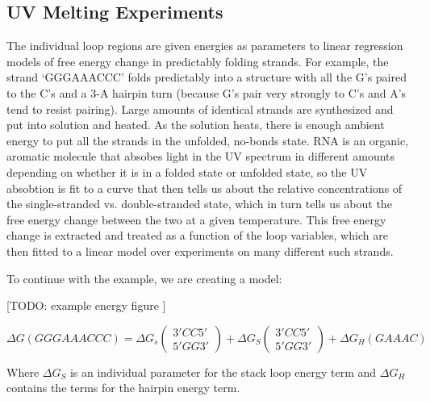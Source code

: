 \subsection{UV Melting Experiments} 

The individual loop regions are given energies as parameters to linear
regression models of free energy change in predictably folding
strands. For example, the strand `GGGAAACCC' folds predictably into a
structure with all the G's paired to the C's and a 3-A hairpin turn
(because G's pair very strongly to C's and A's tend to resist
pairing). Large amounts of identical strands are synthesized and put
into solution and heated. As the solution heats, there is enough
ambient energy to put all the strands in the unfolded, no-bonds
state. RNA is an organic, aromatic molecule that absobes light in the
UV spectrum in different amounts depending on whether it is in a
folded state or unfolded state, so the UV absobtion is fit to a curve
that then tells us about the relative concentrations of the
single-stranded vs. double-stranded state, which in turn tells us
about the free energy change between the two at a given
temperature. This free energy change is extracted and treated as a
function of the loop variables, which are then fitted to a linear
model over experiments on many different such strands.

To continue with the example, we are creating a model:

[TODO: example energy figure ]

\begin{equation}
\Delta G (GGGAAACCC) = \Delta G_s \left ( \begin{array}{c} 3' C C 5 ' \\ 5' G G 3 ' \end{array} \right ) +
\Delta G_S \left ( \begin{array}{c} 3' C C 5 ' \\ 5' G G 3 ' \end{array} \right ) +
\Delta G_H (G AAA C)
\end{equation}

Where $\Delta G_S $ is an individual parameter for the stack loop
energy term and $\Delta G_H$ contains the terms for the hairpin energy
term.

